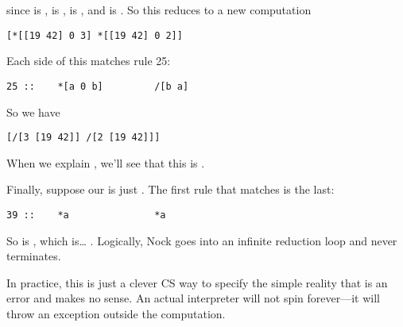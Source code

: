since  is \kode{[19 42]},  is ,  is , and  is \kode{[0 2]}.
So this reduces to a new computation

\begin{framed_shaded}
\begin{Verbatim}[fontsize=\relsize{-2.5},fontseries=b,commandchars=\\\{\}]
[*[[19 42] 0 3] *[[19 42] 0 2]]
\end{Verbatim}
\end{framed_shaded}

Each side of this matches rule 25:

\begin{framed_shaded}
\begin{Verbatim}[fontsize=\relsize{-2.5},fontseries=b,commandchars=\\\{\}]
25 ::    *[a 0 b]         /[b a]
\end{Verbatim}
\end{framed_shaded}

So we have

\begin{framed_shaded}
\begin{Verbatim}[fontsize=\relsize{-2.5},fontseries=b,commandchars=\\\{\}]
[/[3 [19 42]] /[2 [19 42]]]
\end{Verbatim}
\end{framed_shaded}

When we explain \kode{/}, we'll see that this is \kode{[42 19]}.

Finally, suppose our  is just .  The first rule that
matches is the last:

\begin{framed_shaded}
\begin{Verbatim}[fontsize=\relsize{-2.5},fontseries=b,commandchars=\\\{\}]
39 ::    *a               *a
\end{Verbatim}
\end{framed_shaded}

So  is , which is\ldots{} .  Logically, Nock goes into
an infinite reduction loop and never terminates.

In practice, this is just a clever CS way to specify the simple
reality that  is an error and makes no sense.  An actual
interpreter will not spin forever---it will throw an exception
outside the computation.


